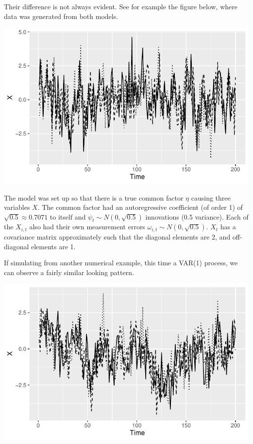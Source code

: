 \documentclass[
  letterpaper,
  DIV=11,
  numbers=noendperiod]{scrartcl}
\begin{document}
Their difference is not always evident. See for example the figure
below, where data was generated from both models.

\includegraphics{TheoreticalStudy--1-_files/figure-pdf/unnamed-chunk-1-1.pdf}

The model was set up so that there is a true common factor \(\eta\)
causing three variables \(X\). The common factor had an autoregressive
coefficient (of order 1) of \(\sqrt{0.5}\approx0.7071\) to itself and
\(\psi_t \sim N(0, \sqrt{0.5})\) innovations (0.5 variance). Each of the
\(X_{i,t}\) also had their own measurement errors
\(\omega_{i,t}\sim N(0,\sqrt{0.5})\). \(X_t\) has a covariance matrix
approximately such that the diagonal elements are 2, and off-diagonal
elements are 1.

If simulating from another numerical example, this time a VAR(1)
process, we can observe a fairly similar looking pattern.

\includegraphics{TheoreticalStudy--1-_files/figure-pdf/unnamed-chunk-2-1.pdf}
\end{document}
